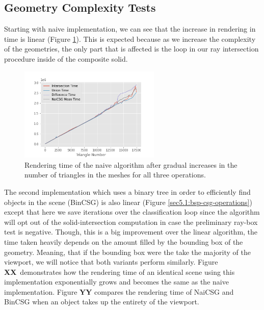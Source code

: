 \documentclass[a4paper,11pt,oneside]{article}
\begin{document}
\subsection{Geometry Complexity Tests}

Starting with naive implementation, we can see that the increase in rendering in time is linear (Figure \ref{sec5.1:naive-csg-operations}). This is expected because as we increase the complexity of the geometries, the only part that is affected is the loop in our ray intersection procedure inside of the composite solid.
\begin{figure}[H]
	\begin{center}
		\includegraphics[width=0.6\textwidth]{section5/NaiCSG-OPS.png}
	\end{center}
	\caption{Rendering time of the naive algorithm after gradual increases in the number of triangles in the meshes for all three operations.}
	\label{sec5.1:naive-csg-operations}
\end{figure}


The second implementation which uses a binary tree in order to efficiently find objects in the scene  (BinCSG) is also linear (Figure \ref{sec5.1:bsp-csg-operations}) except that here we save iterations over the classification loop since the algorithm will opt out of the solid-intersection computation in case the preliminary ray-box test is negative. Though, this is a big improvement over the linear algorithm, the time taken heavily depends on the amount filled by the bounding box of the geometry. Meaning, that if the bounding box were the take the majority of the viewport, we will notice that both variants perform similarly. Figure \textbf{XX} demonstrates how the rendering time of an identical scene using this implementation exponentially grows and becomes the same as the naive implementation. Figure \textbf{YY} compares the rendering time of NaiCSG and BinCSG when an object takes up the entirety of the viewport.
 
\end{document}
